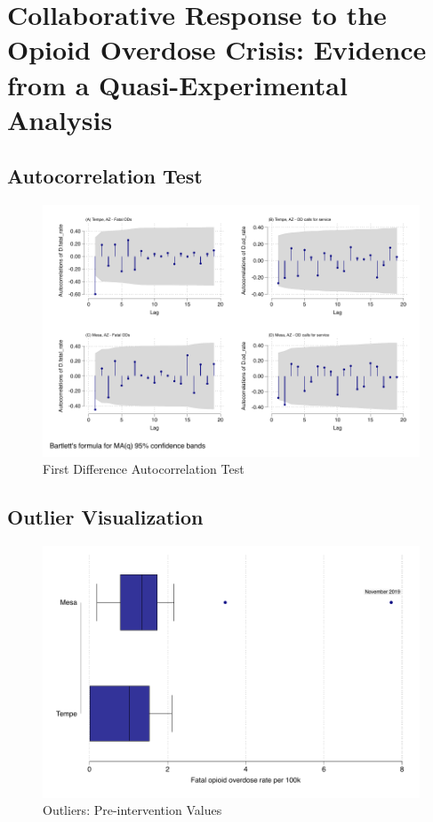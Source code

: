 \chapter{Collaborative Response to the Opioid Overdose Crisis: Evidence from a Quasi-Experimental Analysis}

\section{Autocorrelation Test}
\begin{figure}
    \centering
    \caption{\centering First Difference Autocorrelation Test}
    \includegraphics{figures/ac-lags-combined.pdf}
\end{figure}

\newpage

\section{Outlier Visualization}
\begin{figure}
    \centering
    \caption{\centering Outliers: Pre-intervention Values}
    \includegraphics{figures/outlier.pdf}
\end{figure}

\newpage 




